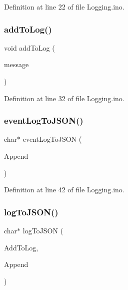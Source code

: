 Definition at line 22 of file Logging.\+ino.

\mbox{\label{_logging_8ino_a7c96ea1fcfbe516b7019d1772b4cdfab}} 
\subsubsection{\texorpdfstring{addToLog()}{addToLog()}\hspace{0.1cm}{\footnotesize\ttfamily [2/2]}}
{\footnotesize\ttfamily void add\+To\+Log (\begin{DoxyParamCaption}\item[{const \+\_\+\+\_\+\+Flash\+String\+Helper $\ast$}]{message }\end{DoxyParamCaption})}



Definition at line 32 of file Logging.\+ino.

\mbox{\label{_logging_8ino_a01701395f5a098fac02e9e0161757e38}} 
\subsubsection{\texorpdfstring{eventLogToJSON()}{eventLogToJSON()}}
{\footnotesize\ttfamily char$\ast$ event\+Log\+To\+J\+S\+ON (\begin{DoxyParamCaption}\item[{bool}]{Append }\end{DoxyParamCaption})}



Definition at line 42 of file Logging.\+ino.

\mbox{\label{_logging_8ino_a3b4deca2ab77732f207bc569e4d8e45b}} 
\subsubsection{\texorpdfstring{logToJSON()}{logToJSON()}}
{\footnotesize\ttfamily char$\ast$ log\+To\+J\+S\+ON (\begin{DoxyParamCaption}\item[{bool}]{Add\+To\+Log,  }\item[{bool}]{Append }\end{DoxyParamCaption})}



